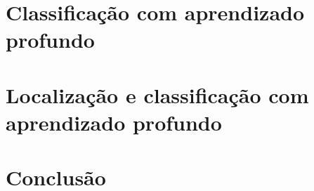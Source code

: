 \documentclass[a5paper]{ufsc-thesis}  %
\begin{document}
\pretextual%
\imprimircapa%
\imprimirfolhaderosto*%
\clearpage
\imprimirfichacatalografica%
\clearpage
\tableofcontents%
\textual%





\chapter{Classificação com aprendizado profundo}
\chapter{Localização e classificação com aprendizado profundo}
\chapter{Conclusão}
\end{document}
